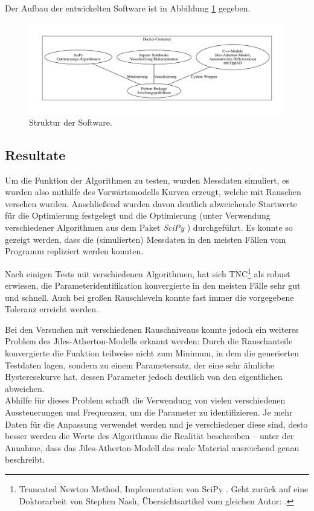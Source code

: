 \documentclass{scrartcl}
\begin{document}
Der Aufbau der entwickelten Software ist in Abbildung \ref{fig:software} gegeben.
\begin{figure}
\caption{Struktur der Software.}\label{fig:software}
	\includegraphics[width=\textwidth]{software}
\end{figure}
\subsection{Resultate}
Um die Funktion der Algorithmen zu testen, wurden Messdaten simuliert, es wurden also mithilfe des Vorwärtsmodells Kurven erzeugt, welche mit Rauschen versehen wurden. Anschließend wurden davon deutlich abweichende Startwerte für die Optimierung festgelegt und die Optimierung (unter Verwendung verschiedener Algorithmen aus dem Paket \emph{SciPy} \cite{scipy}) durchgeführt. Es konnte so gezeigt werden, dass die (simulierten) Messdaten in den meisten Fällen vom Programm repliziert werden konnten.\par
Nach einigen Tests mit verschiedenen Algorithmen, hat sich TNC\footnote{Truncated Newton Method, Implementation von SciPy \cite{scipy}. Geht zurück auf eine Doktorarbeit von Stephen Nash, Übersichtsartikel vom gleichen Autor: \cite{tnc}.} als robust erwiesen, die Parameteridentifikation konvergierte in den meisten Fälle sehr gut und schnell. Auch bei großen Rauschleveln konnte fast immer die vorgegebene Toleranz erreicht werden.\par
Bei den Versuchen mit verschiedenen Rauschniveaus konnte jedoch ein weiteres Problem des Jiles-Atherton-Modells erkannt werden: Durch die Rauschanteile konvergierte die Funktion teilweise nicht zum Minimum, in dem die generierten Testdaten lagen, sondern zu einem Parametersatz, der eine sehr ähnliche Hysteresekurve hat, dessen Parameter jedoch deutlich von den eigentlichen abweichen.\\
Abhilfe für dieses Problem schafft die Verwendung von vielen verschiedenen Aussteuerungen und Frequenzen, um die Parameter zu identifizieren. Je mehr Daten für die Anpassung verwendet werden und je verschiedener diese sind, desto besser werden die Werte des Algorithmus die Realität beschreiben -- unter der Annahme, dass das Jiles-Atherton-Modell das reale Material ausreichend genau beschreibt.\par
\end{document}
